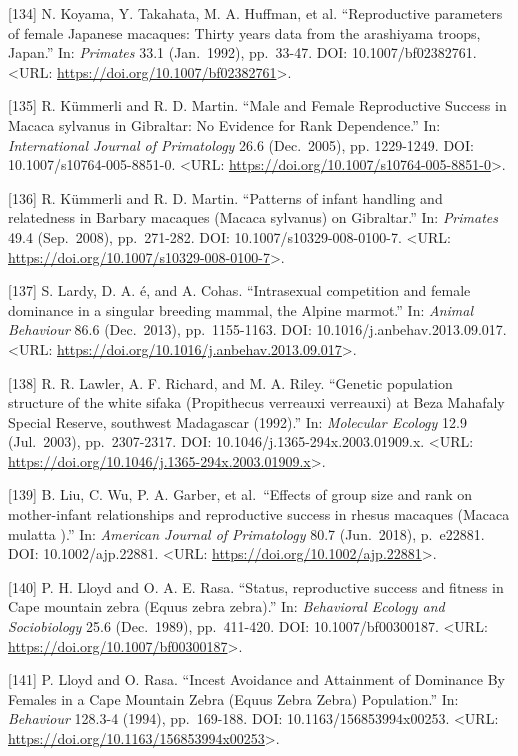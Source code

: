 \documentclass[
]{article}
\begin{document}
{[}134{]} N. Koyama, Y. Takahata, M. A. Huffman, et al. ``Reproductive
parameters of female Japanese macaques: Thirty years data from the
arashiyama troops, Japan.'' In: \emph{Primates} 33.1 (Jan.~1992),
pp.~33-47. DOI: 10.1007/bf02382761. \textless URL:
\url{https://doi.org/10.1007/bf02382761}\textgreater.

{[}135{]} R. Kümmerli and R. D. Martin. ``Male and Female Reproductive
Success in Macaca sylvanus in Gibraltar: No Evidence for Rank
Dependence.'' In: \emph{International Journal of Primatology} 26.6
(Dec.~2005), pp. 1229-1249. DOI: 10.1007/s10764-005-8851-0.
\textless URL:
\url{https://doi.org/10.1007/s10764-005-8851-0}\textgreater.

{[}136{]} R. Kümmerli and R. D. Martin. ``Patterns of infant handling
and relatedness in Barbary macaques (Macaca sylvanus) on Gibraltar.''
In: \emph{Primates} 49.4 (Sep.~2008), pp.~271-282. DOI:
10.1007/s10329-008-0100-7. \textless URL:
\url{https://doi.org/10.1007/s10329-008-0100-7}\textgreater.

{[}137{]} S. Lardy, D. A. é, and A. Cohas. ``Intrasexual competition and
female dominance in a singular breeding mammal, the Alpine marmot.'' In:
\emph{Animal Behaviour} 86.6 (Dec.~2013), pp.~1155-1163. DOI:
10.1016/j.anbehav.2013.09.017. \textless URL:
\url{https://doi.org/10.1016/j.anbehav.2013.09.017}\textgreater.

{[}138{]} R. R. Lawler, A. F. Richard, and M. A. Riley. ``Genetic
population structure of the white sifaka (Propithecus verreauxi
verreauxi) at Beza Mahafaly Special Reserve, southwest Madagascar
(1992).'' In: \emph{Molecular Ecology} 12.9 (Jul.~2003),
pp.~2307-2317. DOI: 10.1046/j.1365-294x.2003.01909.x. \textless URL:
\url{https://doi.org/10.1046/j.1365-294x.2003.01909.x}\textgreater.

{[}139{]} B. Liu, C. Wu, P. A. Garber, et al.~``Effects of group size
and rank on mother-infant relationships and reproductive success in
rhesus macaques (Macaca mulatta ).'' In: \emph{American Journal of
Primatology} 80.7 (Jun.~2018), p.~e22881. DOI: 10.1002/ajp.22881.
\textless URL: \url{https://doi.org/10.1002/ajp.22881}\textgreater.

{[}140{]} P. H. Lloyd and O. A. E. Rasa. ``Status, reproductive success
and fitness in Cape mountain zebra (Equus zebra zebra).'' In:
\emph{Behavioral Ecology and Sociobiology} 25.6 (Dec.~1989),
pp.~411-420. DOI: 10.1007/bf00300187. \textless URL:
\url{https://doi.org/10.1007/bf00300187}\textgreater.

{[}141{]} P. Lloyd and O. Rasa. ``Incest Avoidance and Attainment of
Dominance By Females in a Cape Mountain Zebra (Equus Zebra Zebra)
Population.'' In: \emph{Behaviour} 128.3-4 (1994), pp.~169-188. DOI:
10.1163/156853994x00253. \textless URL:
\url{https://doi.org/10.1163/156853994x00253}\textgreater.
\end{document}

